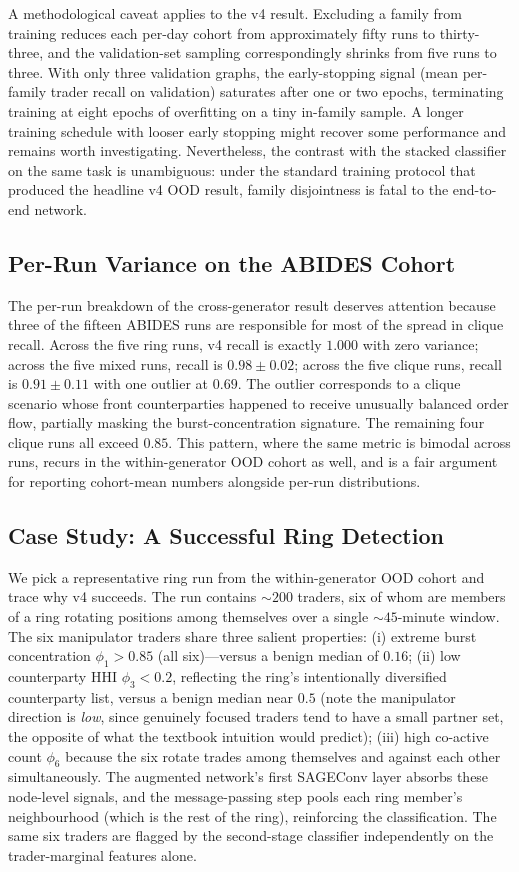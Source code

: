 \documentclass[10pt,twocolumn,letterpaper]{article}
\begin{document}
A methodological caveat applies to the v4 result. Excluding a family
from training reduces each per-day cohort from approximately fifty runs
to thirty-three, and the validation-set sampling correspondingly
shrinks from five runs to three. With only three validation graphs,
the early-stopping signal (mean per-family trader recall on validation)
saturates after one or two epochs, terminating training at eight
epochs of overfitting on a tiny in-family sample. A longer training
schedule with looser early stopping might recover some performance and
remains worth investigating. Nevertheless, the contrast with the
stacked classifier on the same task is unambiguous: under the standard
training protocol that produced the headline v4 OOD result, family
disjointness is fatal to the end-to-end network.


\subsection{Per-Run Variance on the ABIDES Cohort}
\label{sec:abides-var}
The per-run breakdown of the cross-generator result deserves attention
because three of the fifteen ABIDES runs are responsible for most of
the spread in clique recall. Across the five ring runs, v4 recall is
exactly \(1.000\) with zero variance; across the five mixed runs,
recall is \(0.98\pm0.02\); across the five clique runs, recall is
\(0.91\pm0.11\) with one outlier at \(0.69\). The outlier corresponds
to a clique scenario whose front counterparties happened to receive
unusually balanced order flow, partially masking the burst-concentration
signature. The remaining four clique runs all exceed \(0.85\). This
pattern, where the same metric is bimodal across runs, recurs in the
within-generator OOD cohort as well, and is a fair argument for
reporting cohort-mean numbers alongside per-run distributions.

\subsection{Case Study: A Successful Ring Detection}
\label{sec:case}
We pick a representative ring run from the within-generator OOD cohort
and trace why v4 succeeds. The run contains \(\sim\!200\) traders, six
of whom are members of a ring rotating positions among themselves over
a single \(\sim\!45\)-minute window. The six manipulator traders share
three salient properties:
(i) extreme burst concentration \(\phi_1 > 0.85\) (all six)---versus
a benign median of \(0.16\);
(ii) low counterparty HHI \(\phi_3 < 0.2\), reflecting the ring's
intentionally diversified counterparty list, versus a benign median
near \(0.5\) (note the manipulator direction is \emph{low}, since
genuinely focused traders tend to have a small partner set, the
opposite of what the textbook intuition would predict);
(iii) high co-active count \(\phi_6\) because the six rotate trades
among themselves and against each other simultaneously.
The augmented network's first SAGEConv layer absorbs these node-level
signals, and the message-passing step pools each ring member's
neighbourhood (which is the rest of the ring), reinforcing the
classification. The same six traders are flagged by the second-stage
classifier independently on the trader-marginal features alone.
\end{document}
